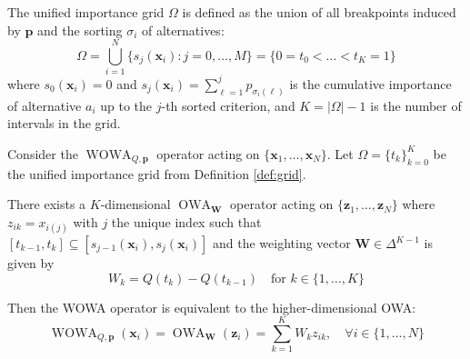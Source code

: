 \begin{definition}
	\label{def:grid}
		The unified importance grid $\Omega$ is defined as the union of all breakpoints induced by $\mathbf{p}$ and the sorting $\sigma_i$ of alternatives:
		\[
			\Omega=\bigcup_{i=1}^{N}\{s_j(\mathbf{x}_i):j=0,\dots,M\}=\{0=t_0<\dots<t_K=1\}
		\]
		where $s_0(\mathbf{x}_i)=0$ and $s_j(\mathbf{x}_i)=\sum_{\ell=1}^{j} p_{\sigma_i(\ell)}$ is the cumulative importance of alternative $a_i$ up to the $j$-th sorted criterion, and $K = |\Omega| - 1$ is the number of intervals in the grid.
\end{definition}

\begin{theorem}
	\label{thm:wowa}
		Consider the $\operatorname{WOWA}_{Q,\mathbf{p}}$ operator acting on $\{\mathbf{x}_1,\dots,\mathbf{x}_N\}$. Let $\Omega = \{t_k\}_{k=0}^K$ be the unified importance grid from Definition \ref{def:grid}.

		There exists a $K$-dimensional $\operatorname{OWA}_\mathbf{W}$ operator acting on $\{\mathbf{z}_1,\dots,\mathbf{z}_N\}$ where $z_{ik} = x_{i(j)}$ with $j$ the unique index such that $[t_{k-1}, t_k] \subseteq [s_{j-1}(\mathbf{x}_i), s_j(\mathbf{x}_i)]$ and the weighting vector $\mathbf{W}\in\Delta^{K-1}$ is given by
		\[
			W_k = Q(t_k) - Q(t_{k-1}) \quad \text{for } k \in \{1, \dots, K\}
		\]

		Then the WOWA operator is equivalent to the higher-dimensional OWA:
		\[
			\operatorname{WOWA}_{Q,\mathbf{p}}(\mathbf{x}_i)=\operatorname{OWA}_{\mathbf{W}}(\mathbf{z}_i)=\sum_{k=1}^K W_k z_{ik},\quad \forall i\in\{1,\dots,N\}
		\]
\end{theorem}

